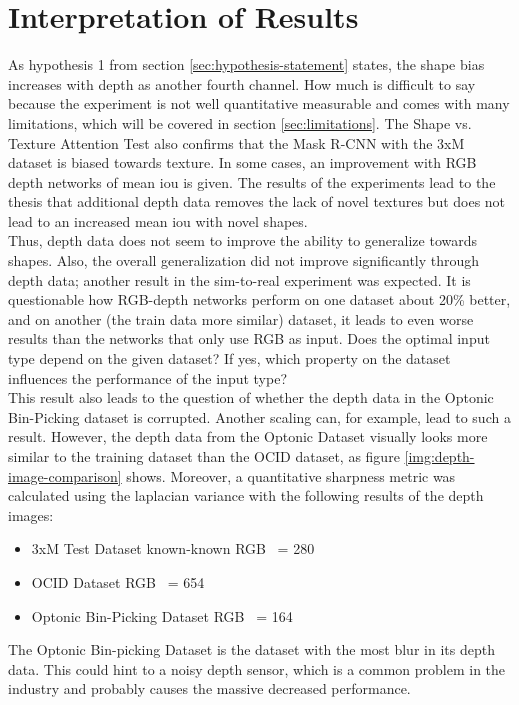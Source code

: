 	\section{Interpretation of Results}
	\label{sec:interpretation-of-results}
		As hypothesis 1 from section \ref{sec:hypothesis-statement} states, the shape bias increases with depth as another fourth channel. How much is difficult to say because the experiment is not well quantitative measurable and comes with many limitations, which will be covered in section \ref{sec:limitations}. The Shape vs. Texture Attention Test also confirms that the Mask R-CNN with the 3xM dataset is biased towards texture. In some cases, an improvement with RGB depth networks of mean \ac{iou} is given. The results of the experiments lead to the thesis that additional depth data removes the lack of novel textures but does not lead to an increased mean \ac{iou} with novel shapes.\\
		Thus, depth data does not seem to improve the ability to generalize towards shapes. Also, the overall generalization did not improve significantly through depth data; another result in the sim-to-real experiment was expected. It is questionable how RGB-depth networks perform on one dataset about 20\% better, and on another (the train data more similar) dataset, it leads to even worse results than the networks that only use RGB as input.
		\clearpage
		Does the optimal input type depend on the given dataset? If yes, which property on the dataset influences the performance of the input type?\\
		This result also leads to the question of whether the depth data in the Optonic Bin-Picking dataset is corrupted. Another scaling can, for example, lead to such a result. However, the depth data from the Optonic Dataset visually looks more similar to the training dataset than the OCID dataset, as figure \ref{img:depth-image-comparison} shows. Moreover, a quantitative sharpness metric was calculated using the laplacian variance with the following results of the depth images:
		\begin{itemize}
			\item 3xM Test Dataset known-known RGB ~= 280
			\item OCID Dataset RGB ~= 654
			\item Optonic Bin-Picking Dataset RGB ~= 164
		\end{itemize}
		The Optonic Bin-picking Dataset is the dataset with the most blur in its depth data. This could hint to a noisy depth sensor, which is a common problem in the industry \cite{Raj2023} and probably causes the massive decreased performance.\\
